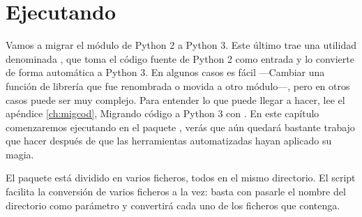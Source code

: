 \section{Ejecutando }

Vamos a migrar el módulo  de Python 2 a Python 3. Este último trae una utilidad denominada , que toma el código fuente de Python 2 como entrada y lo convierte de forma automática a Python 3. En algunos casos es fácil ---Cambiar una función de librería que fue renombrada o movida a otro módulo---, pero en otros casos puede ser muy complejo. Para entender lo que puede llegar a hacer, lee el apéndice \ref{ch:migcod}, Migrando código a Python 3 con . En este capítulo comenzaremos ejecutando  en el paquete , verás que aún quedará bastante trabajo que hacer después de que las herramientas automatizadas hayan aplicado su magia.

El paquete  está dividido en varios ficheros, todos en el mismo directorio. El script  facilita la conversión de varios ficheros a la vez: basta con pasarle el nombre del directorio como parámetro y  convertirá cada uno de los ficheros que contenga.


